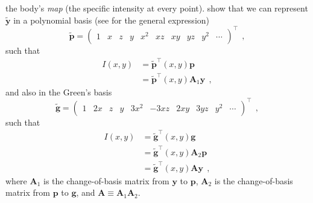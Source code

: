 \documentclass[12pt,dvipsnames]{report}
\renewcommand{\vec}[1]{\boldsymbol{\mathbf{#1}}}
\newcommand{\hquad}{~~}
\begin{document}
the body's \emph{map} (the specific intensity at every point).
\citet{2019AJ....157...64L} show that we can represent $\tilde {\vec y}$ in a polynomial basis (see
\citet{2019AJ....157...64L} for the general expression)
\begin{equation}
    \tilde{\boldsymbol{p}}=\left(\begin{array}{llllllllll}
        1 & x & z & y & x^{2} & x z & x y & y z & y^{2} & \cdots
    \end{array}\right)^{\intercal}
    \hquad,
\end{equation}
such that
\begin{align}
    I(x, y) & =\tilde{\mathbf{p}}^{\intercal}(x, y) \mathbf{p}                    \\
            & =\tilde{\mathbf{p}}^{\intercal}(x, y) \mathbf{A}_1 \mathbf{y}
            \hquad,
    \label{eq:intensity_poly_basis}
\end{align}
and also in the Green's basis
\begin{equation}
    \tilde{\boldsymbol{g}}=\left(\begin{array}{llllllllll}
        1 & 2 x & z & y & 3 x^{2} & -3 x z & 2 x y & 3 y z & y^{2} & \cdots
    \end{array}\right)^{\intercal}
    \hquad,
\end{equation}
such that
\begin{align}
    I(x, y) & =\tilde{\mathbf{g}}^{\intercal}(x, y) \mathbf{g}              \\
            & =\tilde{\mathbf{g}}^{\intercal}(x, y) \mathbf{A}_2 \mathbf{p} \\
            & =\tilde{\mathbf{g}}^{\intercal}(x, y) \mathbf{A} \mathbf{y}
            \hquad,
\end{align}
where $\mathbf{A}_1$ is the change-of-basis matrix from $\mathbf{y}$ to $\mathbf{p}$,
$\mathbf{A}_2$ is the change-of-basis matrix from $\mathbf{p}$ to $\mathbf{g}$, and
$\mathbf{A}\equiv \mathbf{A}_1 \mathbf{A}_2$.
\end{document}
